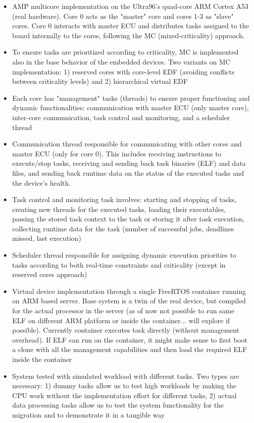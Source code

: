 \begin{itemize}
	\item AMP multicore implementation on the Ultra96's quad-core ARM Cortex A53 (real hardware). Core 0 acts as the "master" core and cores 1-3 as "slave" cores. Core 0 interacts with master ECU and distributes tasks assigned to the board internally to the cores, following the MC (mixed-criticality) approach.
	\item To ensure tasks are prioritized according to criticality, MC is implemented also in the base behavior of the embedded devices. Two variants on MC implementation: 1) reserved cores with core-level EDF (avoiding conflicts between criticality levels) and 2) hierarchical virtual EDF
	\item Each core has "management" tasks (threads) to ensure proper functioning and dynamic functionalities: communication with master ECU (only master core), inter-core communication, task control and monitoring, and a scheduler thread
	\item Communication thread responsible for communicating with other cores and master ECU (only for core 0). This includes receiving instructions to execute/stop tasks, receiving and sending back task binaries (ELF) and data files, and sending back runtime data on the status of the executed tasks and the device's health.
	\item Task control and monitoring task involves: starting and stopping of tasks, creating new threads for the executed tasks, loading their executables, passing the stored task context to the task or storing it after task execution, collecting runtime data for the task (number of successful jobs, deadlines missed, last execution)
	\item Scheduler thread responsible for assigning dynamic execution priorities to tasks according to both real-time constraints and criticality (except in reserved cores approach)
	\item Virtual device implementation through a single FreeRTOS container running on ARM based server. Base system is a twin of the real device, but compiled for the actual processor in the server (as of now not possible to run same ELF on different ARM platform or inside the container... will explore if possible). Currently container executes task directly (without management overhead). If ELF can run on the container, it might make sense to first boot a clone with all the management capabilities and then load the required ELF inside the container
	\item System tested with simulated workload with different tasks. Two types are necessary: 1) dummy tasks allow us to test high workloads by making the CPU work without the implementation effort for different tasks, 2) actual data processing tasks allow us to test the system functionality for the migration and to demonstrate it in a tangible way

\end{itemize}
